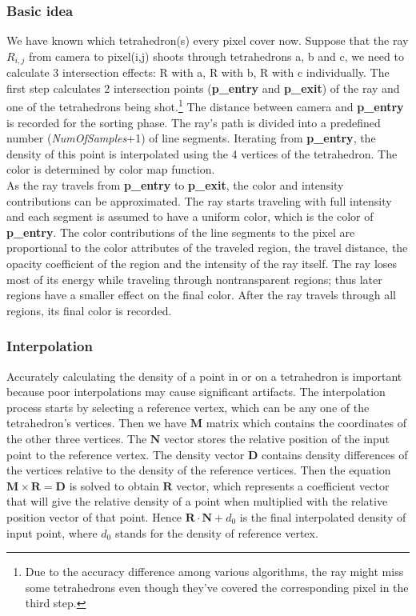 \documentclass[acmtog]{acmart}
\begin{document}
\subsubsection{Basic idea} 
We have known which tetrahedron(s) every pixel cover now. Suppose that the ray $R_{i,j}$ from camera to pixel(i,j) shoots through tetrahedrons a, b and c, we need to calculate 3 intersection effects: R with a, R with b, R with c individually. The first step calculates 2 intersection points (\textbf{p\_entry} and \textbf{p\_exit}) of the ray and one of the tetrahedrons being shot.\footnote{Due to the accuracy difference among various algorithms, the ray might miss some tetrahedrons even though they've covered the corresponding pixel in the third step.}
The distance between camera and \textbf{p\_entry} is recorded for the sorting phase. The ray’s path is divided into a predefined number (\emph{NumOfSamples}+1) of line segments. Iterating from \textbf{p\_entry}, the density of this point is interpolated using the 4 vertices of the tetrahedron. The color is determined by color map function. 
\\
As the ray travels from \textbf{p\_entry} to \textbf{p\_exit}, the color and intensity contributions can be approximated. The ray starts traveling with full intensity and each segment is assumed to have a uniform color, which is the color of \textbf{p\_entry}. The color contributions of the line segments to the pixel are proportional to the color attributes of the traveled region, the travel distance, the opacity coefficient of the region and the intensity of the ray itself. The ray loses most of its energy while traveling through nontransparent regions; thus later regions have a smaller effect on the final color. After the ray travels through all regions, its final color is recorded.
\subsubsection{Interpolation}
Accurately calculating the density of a point in or on a tetrahedron is important because poor interpolations may cause significant artifacts. The interpolation process starts by selecting a reference vertex, which can be any one of the tetrahedron’s vertices. Then we have $\boldsymbol{M}$ matrix which contains the coordinates of the other three vertices. The $\boldsymbol{N}$ vector stores the relative position of the input point to the reference vertex. The density vector $\boldsymbol{D}$ contains density differences of the vertices relative to the density of the reference vertices. Then the equation $\boldsymbol{M} \times \boldsymbol{R}=\boldsymbol{D}$ is solved to obtain $\boldsymbol{R}$ vector, which represents a coefficient vector that will give the relative density of a point when multiplied with the relative position vector of that point. Hence $\boldsymbol{R} \cdot \boldsymbol{N} + d_0$ is the final interpolated density of input point, where $d_0$ stands for the density of reference vertex. 
\end{document}
